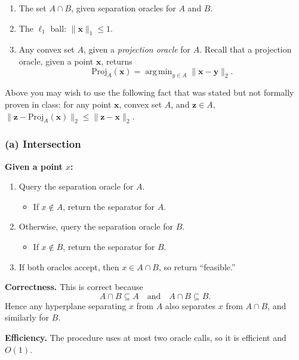 \documentclass[10pt]{article}
\newcommand{\bv}[1]{\mathbf{#1}}
\DeclareMathOperator*{\argmin}{arg\,min}
\begin{document}
\begin{enumerate}[label=(\alph*)]
	\item
	The set $A \cap B$, given separation oracles for $A$ and $B$.
	
	\item
	The $\ell_1$ ball: $\| \bv{x} \|_1 \leq 1$.
	
	\item
	Any convex set $A$, given a \emph{projection oracle} for $A$. Recall that a projection oracle, given a point $\bv{x}$, returns
	\begin{equation*}
		\text{Proj}_A(\bv{x}) =  \argmin_{y \in A} \| \bv{x} - \bv{y} \|_2.
	\end{equation*}
	
\end{enumerate}
Above you may wish to use the following fact that was stated but not formally proven in class: for any point $\bv{x}$, convex set $A$, and $\bv{z}\in A$, $\|\bv{z}-\text{Proj}_A(\bv{x})\|_2 \leq \|\bv{z} - \bv{x}\|_2$.

\subsubsection*{(a) Intersection}

\textbf{Given a point $x$:}
\begin{enumerate}
	\item Query the separation oracle for $A$.
	\begin{itemize}
		\item If $x\notin A$, return the separator for $A$.
	\end{itemize}
	\item Otherwise, query the separation oracle for $B$.
	\begin{itemize}
		\item If $x\notin B$, return the separator for $B$.
	\end{itemize}
	\item If both oracles accept, then $x\in A\cap B$, so return ``feasible.''
\end{enumerate}

\textbf{Correctness.}
This is correct because
\[
A\cap B \subseteq A
\quad\text{and}\quad
A\cap B \subseteq B.
\]
Hence any hyperplane separating $x$ from $A$ also separates $x$ from $A\cap B$, and similarly for $B$.

\textbf{Efficiency.}
The procedure uses at most two oracle calls, so it is efficient and $O(1)$.
\end{document}
